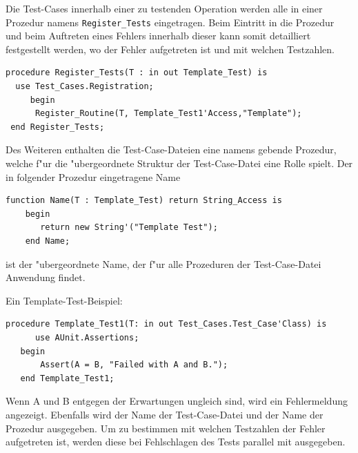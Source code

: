Die Test-Cases innerhalb einer zu testenden Operation werden alle in
einer Prozedur namens {\tt Register\_Tests} eingetragen.  Beim Eintritt
in die Prozedur und beim Auftreten eines Fehlers innerhalb dieser kann
somit detailliert festgestellt werden, wo der Fehler aufgetreten ist
und mit welchen Testzahlen.

\begin{lstlisting}
procedure Register_Tests(T : in out Template_Test) is
  use Test_Cases.Registration;
     begin
      Register_Routine(T, Template_Test1'Access,"Template");
 end Register_Tests;
\end{lstlisting}

Des Weiteren enthalten die Test-Case-Dateien eine namens gebende
Prozedur, welche f"ur die "ubergeordnete Struktur der Test-Case-Datei
eine Rolle spielt.  Der in folgender Prozedur eingetragene Name

\begin{lstlisting}
function Name(T : Template_Test) return String_Access is
	begin
	   return new String'("Template Test");
	end Name;
\end{lstlisting}

ist der "ubergeordnete Name, der f"ur alle Prozeduren der
Test-Case-Datei Anwendung findet.

Ein Template-Test-Beispiel:
\begin{lstlisting}
procedure Template_Test1(T: in out Test_Cases.Test_Case'Class) is
      use AUnit.Assertions; 
   begin      
       Assert(A = B, "Failed with A and B.");
   end Template_Test1;
\end{lstlisting}

Wenn A und B entgegen der Erwartungen ungleich sind, wird ein
Fehlermeldung angezeigt. Ebenfalls wird der Name der Test-Case-Datei
und der Name der Prozedur ausgegeben.  Um zu bestimmen mit welchen
Testzahlen der Fehler aufgetreten ist, werden diese bei Fehlschlagen
des Tests parallel mit ausgegeben.


